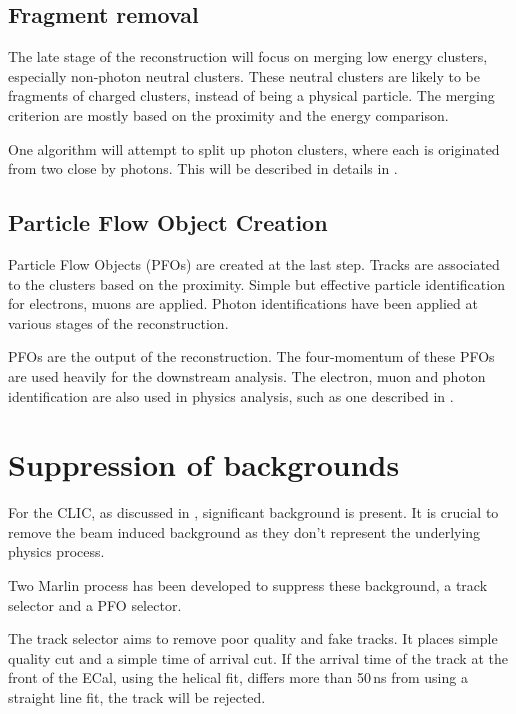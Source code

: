 \subsection{Fragment removal}

The late stage of the reconstruction will focus on merging low energy clusters, especially non-photon neutral clusters. These neutral clusters are likely to be fragments of charged clusters, instead of being a physical particle. The merging criterion are mostly based on the proximity and the energy comparison.

One algorithm will attempt to split up photon clusters, where each is originated from two close by photons. This will be described in details in \Chapter{}.

\subsection{Particle Flow Object Creation}

Particle Flow Objects (PFOs) are created at the last step. Tracks are associated to the clusters based on the proximity. Simple but effective particle identification for electrons, muons are applied. Photon identifications have been applied at various stages of the reconstruction.

PFOs are the output of the \pandora reconstruction. The four-momentum of these PFOs are  used heavily for the downstream analysis. The electron, muon and photon identification are  also used in physics analysis, such as one described in \Chapter{}.

\section{Suppression of \ggHad backgrounds}

For the CLIC, as discussed in \Section{}, significant \ggHad background is present. It is crucial to remove the beam induced background as they don't represent the underlying physics process.

Two Marlin process has been developed to suppress these background, a track selector and a PFO selector\cite{Marshall:2012ry}.

The track selector aims to remove poor quality and fake tracks. It places simple quality cut and a simple time of arrival cut. If the arrival time of the track at the front of the ECal, using the helical fit, differs more than 50\,ns from using a straight line fit, the track will be rejected.

